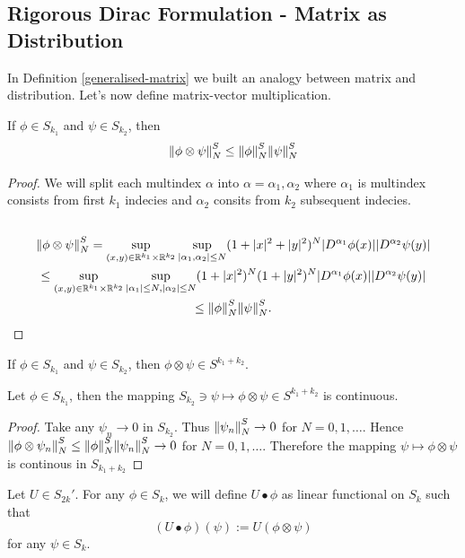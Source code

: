\documentclass[main.tex]{subfiles}
\begin{document}
\subsection{Rigorous Dirac Formulation - Matrix as Distribution}
\label{rigorous-dirac-formulation-matrix-distribution}
In Definition \ref{generalised-matrix} we built an analogy between matrix and distribution. Let's now define matrix-vector multiplication.
\begin{fact}
If $\phi\in S_{k_1}$ and $\psi\in S_{k_2}$, then
\begin{equation}
\norm{\phi\otimes\psi}^S_N \leq \norm{\phi}^S_N \norm{\psi}^S_N
\end{equation}
\end{fact}
\begin{proof}
We will split each multindex $\alpha$ into $\alpha=\alpha_1, \alpha_2$ where $\alpha_1$ is multindex consists from first $k_1$ indecies and $\alpha_2$ consits from $k_2$ subsequent indecies.
\begin{multline}
\\
\norm{\phi\otimes\psi}^S_N = \sup_{(x,y)\in\mathbb{R}^{k_1}\times\mathbb{R}^{k_2}}
\sup_{|\alpha_1,\alpha_2| \leq N} (1 + |x|^2 + |y|^2)^N |D^{\alpha_1}\phi(x)||D^{\alpha_2}\psi(y)| \\
\leq \sup_{(x,y)\in\mathbb{R}^{k_1}\times\mathbb{R}^{k_2}}
\sup_{|\alpha_1| \leq N,|\alpha_2| \leq N} (1 + |x|^2)^N (1 + |y|^2)^N 
|D^{\alpha_1}\phi(x)||D^{\alpha_2}\psi(y)|\\
\leq \norm{\phi}^S_N \norm{\psi}^S_N.\\
\end{multline}
\end{proof}
\begin{corollary}
If  $\phi\in S_{k_1}$ and $\psi\in S_{k_2}$, then $\phi\otimes\psi\in S^{k_1 + k_2}$.
\end{corollary}
\begin{corollary} 
\label{continous-tempered-tensor-product}
Let $\phi\in S_{k_1}$, then the
mapping $S_{k_2} \ni \psi \mapsto \phi \otimes \psi \in S^{k_1 + k_2}$ is continuous.
\end{corollary}
\begin{proof}
Take any $\psi_n \to 0$ in $S_{k_2}$. Thus $\norm{\psi_n}^S_N\to 0$ for $N=0,1, \dots$. Hence $\norm{\phi\otimes\psi_n}^S_N \leq \norm{\phi}^S_N \norm{\psi_n}^S_N\to 0$ for $N=0,1, \dots$. Therefore the mapping $\psi \mapsto \phi \otimes \psi$ is continous in $S_{k_1 + k_2}$ 
\end{proof}
\begin{definition}
\label{matrix-as-distribution}
Let $U\in S_{2k}'$. For any $\phi\in S_k$, we will define $U\bullet\phi$ as linear functional on $S_k$ such that
\begin{equation}
(U\bullet\phi)(\psi) := U(\phi\otimes\psi)
\end{equation}
for any $\psi\in S_k$. 
\end{definition}
\end{document}
